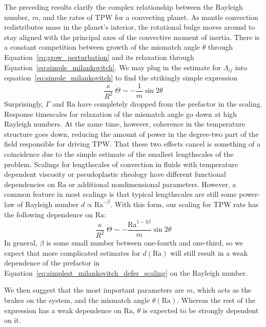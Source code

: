 \documentclass[extra,mreferee]{gji}
\begin{document}
The preceding results clarify the complex relationship between the Rayleigh number, $m$, and the rates of TPW for a convecting planet.
As mantle convection redistributes mass in the planet's interior, the rotational bulge moves around to stay aligned with the principal axes of the convective moment of inertia. 
There is a constant competition between growth of the mismatch angle $\theta$ through 
Equation~\eqref{eq:grow_perturbation} and its relaxation through Equation~\eqref{eq:simple_milankovitch}.
We may plug in the estimate for $\Lambda_{ij}$ into equation~\eqref{eq:simple_milankovitch} to find the strikingly simple expression
\begin{equation}
\frac{\kappa}{R^2} \; \dot{\Theta} \sim -\frac{1}{m} \sin{2 \theta}
\label{eq:simplest_milankovitch}
\end{equation}
Surprisingly, $\Gamma$ and $\mathrm{Ra}$ have completely dropped from the prefactor in the scaling. 
Response timescales for relaxation of the mismatch angle go down at high Rayleigh numbers.
At the same time, however, coherence in the temperature structure goes down, reducing the amount of power in the degree-two part of the field responsible for driving TPW.
That these two effects cancel is something of a coincidence due to the simple estimate of the smallest lengthscales of the problem.
Scalings for lengthscales of convection in fluids with temperature dependent viscosity \citep[e.g.][]{solomatov1995scaling} or pseudoplastic rheology \citep[e.g.][]{korenaga2010scaling} have different functional dependencies on $\mathrm{Ra}$ or additional nondimensional parameters.
However, a common feature in most scalings is that typical lengthscales are still some power-law of Rayleigh number $d \propto \mathrm{Ra}^{-\beta}$.
With this form, our scaling for TPW rate has the following dependence on $\mathrm{Ra}$:
\begin{equation}
\frac{\kappa}{R^2} \; \dot{\Theta} \sim -\frac{\mathrm{Ra}^{1-3\beta}}{m} \sin{2 \theta}
\label{eq:simplest_milankovitch_defer_scaling}
\end{equation}
In general, $\beta$ is some small number between one-fourth and one-third, so we expect that more complicated estimates for 
$d(\mathrm{Ra})$ will still result in a weak dependence of the prefactor in Equation~\eqref{eq:simplest_milankovitch_defer_scaling} 
on the Rayleigh number.

We then suggest that the most important parameters are $m$, which acts as the brakes on the system, and the mismatch angle $\theta(\mathrm{Ra})$.
Whereas the rest of the expression has a weak dependence on $\mathrm{Ra}$, $\theta$ is expected to be strongly dependent on it.
\end{document}
